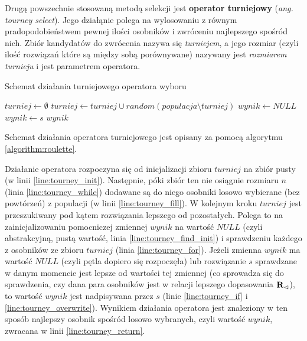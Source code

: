 \documentclass[./FM_mgr.tex]{subfiles}
\begin{document}
	Drugą powszechnie stosowaną metodą selekcji jest \textbf{operator turniejowy} (\emph{ang. tourney select}).
	Jego działąnie polega na wylosowaniu z równym pradopodobieństwem pewnej ilości osobników i zwróceniu najlepszego spośród nich.
	Zbiór kandydatów do zwrócenia nazywa się \emph{turniejem}, a jego rozmiar (czyli ilość rozwiązań które są między sobą porównywane) nazywany jest \emph{rozmiarem turnieju} i jest parametrem operatora.
	
	\begin{algorithm}[h]
		\caption{Schemat działania turniejowego operatora wyboru \label{algorithm:tourney}}
		\begin{algorithmic}[1]
			\Start
			\Var $turniej \gets \emptyset$
			\label{line:tourney_init}
			\label{line:tourney_while}
			\State $turniej \gets turniej \cup random(populacja \setminus turniej)$
			\label{line:tourney_fill}
			\EndWhile
			\Var $wynik \gets NULL$
			\label{line:tourney_find_init}
			\label{line:tourney_for}
			\label{line:tourney_if}
			\State $wynik \gets s$
			\label{line:tourney_overwrite}
			\EndIf
			\EndFor
			\State \Return $wynik$
			\label{line:tourney_return}
			\EndOperator
		\end{algorithmic}
	\end{algorithm}
	
	Schemat działania operatora turniejowego jest opisany za pomocą algorytmu \ref{algorithm:roulette}.
	
	Działanie operatora rozpoczyna się od inicjalizacji zbioru $turniej$ na zbiór pusty (w linii \ref{line:tourney_init}).
	Następnie, póki zbiór ten nie osiągnie rozmiaru $n$ (linia \ref{line:tourney_while}) dodawane są do niego osobniki losowo wybierane (bez powtórzeń) z populacji (w linii \ref{line:tourney_fill}).
	W kolejnym kroku $turniej$ jest przeszukiwany pod kątem rozwiązania lepszego od pozostałych.
	Polega to na zainicjalizowaniu pomocniczej zmiennej $wynik$ na wartość $NULL$ (czyli abstrakcyjną, pustą wartość, linia \ref{line:tourney_find_init}) i sprawdzeniu każdego z osobników ze zbioru $turniej$ (linia \ref{line:tourney_for}). 
	Jeżeli zmienna $wynik$ ma wartość $NULL$ (czyli pętla dopiero się rozpoczęła) lub rozwiązanie $s$ sprawdzane w danym momencie jest lepsze od wartości tej zmiennej (co sprowadza się do sprawdzenia, czy dana para osobników jest w relacji lepszego dopasowania ${\mathbf{R}}_{\lhd}$), to wartość $wynik$ jest nadpisywana przez $s$ (linie \ref{line:tourney_if} i \ref{line:tourney_overwrite}).
	Wynikiem działania operatora jest znaleziony w ten sposób najlepszy osobnik spośród losowo wybranych, czyli wartość $wynik$, zwracana w linii \ref{line:tourney_return}.
	
\end{document}
